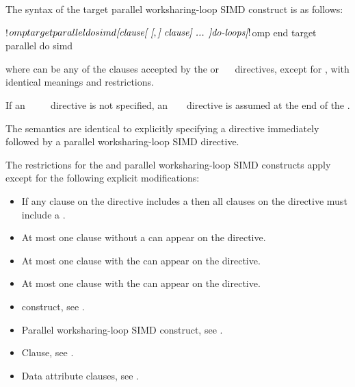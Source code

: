 \begin{fortranspecific}
The syntax of the target parallel worksharing-loop SIMD construct is as follows:

\begin{ompfPragma}
!$omp target parallel do simd \plc{[clause[ [},\plc{] clause] ... ]}
    \plc{do-loops}
\plc{[}!$omp end target parallel do simd\plc{]}
\end{ompfPragma}

where  can be any of the clauses accepted by the  or
~~ directives, except for , 
with identical meanings and restrictions.

If an ~~~~ directive 
is not specified, an ~  ~ 
directive is assumed at the end of the .
\end{fortranspecific}

\descr
The semantics are identical to explicitly specifying a  directive
immediately followed by a parallel worksharing-loop SIMD directive.


\restrictions
The restrictions for the  and parallel worksharing-loop SIMD 
constructs apply except for the following explicit modifications:

\begin{itemize}
\item If any  clause on the directive includes a
       then all  clauses
      on the directive must include a .
\item At most one  clause without a
       can appear on the directive.
\item At most one  clause with the 
       can appear on the directive.
\item At most one  clause with the 
       can appear on the directive.
\end{itemize}

\crossreferences
\begin{itemize}
\item {} construct, see
.

\item Parallel worksharing-loop SIMD construct, see
.

\item {} Clause, see .

\item Data attribute clauses, see
.
\end{itemize}



